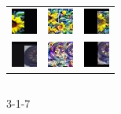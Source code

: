 \begin{figure}[h]
    \begingroup
    \setlength{\tabcolsep}{1.8pt}
    \begin{subtable}{.33\linewidth}
        \centering
        {\begin{tabular}{ l l l }
             \includegraphics[width = 24pt]{enhimages317/ori_77.jpg} & \includegraphics[width = 24pt]{defimages317/rec_77.jpg} &
             \includegraphics[width = 24pt]{enhimages317/rec_77.jpg} \\
             \includegraphics[width = 24pt]{enhimages317/ori_91.jpg} & \includegraphics[width = 24pt]{defimages317/rec_91.jpg} &
             \includegraphics[width = 24pt]{enhimages317/rec_91.jpg} \\
        \end{tabular}}
        \caption{3-1-7}%
    \end{subtable}%
    \begin{subtable}{.33\linewidth}
        \centering
        {\begin{tabular}{ l l l }

\end{tabular}}
\end{subtable}
\end{figure}
